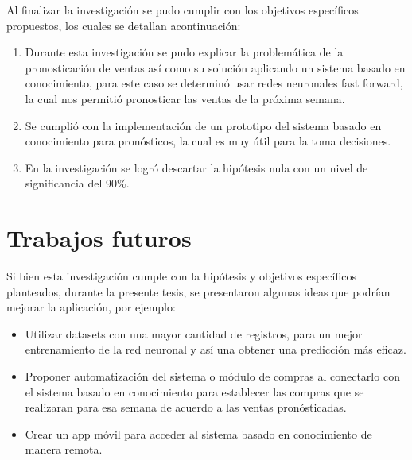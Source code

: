 Al finalizar la investigación se pudo cumplir con los objetivos específicos propuestos, los cuales se detallan acontinuación:
\begin{enumerate}
\item Durante esta investigación se pudo explicar la problemática de la pronosticación de ventas así como su solución aplicando un sistema basado en conocimiento, para este caso se determinó usar redes neuronales fast forward, la cual nos permitió pronosticar las ventas de la próxima semana.
\item Se cumplió con la implementación de un prototipo del sistema basado en conocimiento para pronósticos, la cual es muy útil para la toma decisiones.
\item En la investigación se logró descartar la hipótesis nula con un nivel de significancia del 90\%.
\end{enumerate}

\section{Trabajos futuros}

Si bien esta investigación cumple con la hipótesis y objetivos específicos planteados, durante la presente tesis, se presentaron algunas ideas que podrían mejorar la aplicación, por ejemplo:

\begin{itemize}
\item Utilizar datasets con una mayor cantidad de registros, para un mejor entrenamiento de la red neuronal y así una obtener una predicción más eficaz.
\item Proponer automatización del sistema o módulo de compras al conectarlo con el sistema basado en conocimiento para establecer las compras que se realizaran para esa semana de acuerdo a las ventas pronósticadas.
\item Crear un app móvil para acceder al sistema basado en conocimiento de manera remota.
\end{itemize}



\cleardoublepage
\renewcommand\bibname{Referencias bibliográficas}


